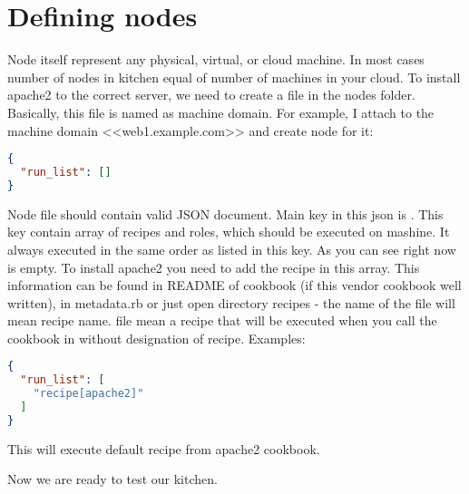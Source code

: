 \section{Defining nodes}
\label{sec:solo-node}

Node itself represent any physical, virtual, or cloud machine. In most cases number of nodes in kitchen equal of number of machines in your cloud. To install apache2 to the correct server, we need to create a file in the nodes folder. Basically, this file is named as machine domain. For example, I attach to the machine domain <<web1.example.com>> and create node for it:

\begin{lstlisting}[language=JSON,label=lst:my-cloud-node1,title=my-cloud/nodes/web1.example.com.json]
{
  "run_list": []
}
\end{lstlisting}

Node file should contain valid JSON document. Main key in this json is . This key contain array of recipes and roles, which should be executed on mashine. It always executed in the same order as listed in this key. As you can see right now  is empty. To install apache2 you need to add the recipe in this array. This information can be found in README of cookbook (if this vendor cookbook well written), in metadata.rb or just open directory recipes - the name of the file will mean recipe name.  file mean a recipe that will be executed when you call the cookbook in  without designation of recipe. Examples:

\begin{lstlisting}[language=JSON,label=lst:my-cloud-node2,title=my-cloud/nodes/web1.example.com.json]
{
  "run_list": [
    "recipe[apache2]"
  ]
}
\end{lstlisting}

This  will execute default recipe from apache2 cookbook.

Now we are ready to test our kitchen.
